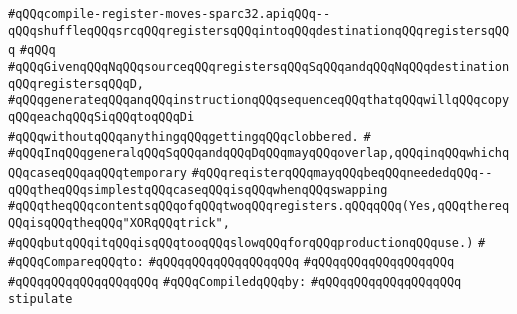 \label{src/lib/compiler/back/low/sparc32/code/compile-register-moves-sparc32.api}
\verb|#qQQqcompile-register-moves-sparc32.apiqQQq--qQQqshuffleqQQqsrcqQQqregistersqQQqintoqQQqdestinationqQQqregistersqQQq|\newline
\verb|#qQQq|\newline
\verb|#qQQqGivenqQQqNqQQqsourceqQQqregistersqQQqSqQQqandqQQqNqQQqdestinationqQQqregistersqQQqD,|\newline
\verb|#qQQqgenerateqQQqanqQQqinstructionqQQqsequenceqQQqthatqQQqwillqQQqcopyqQQqeachqQQqSiqQQqtoqQQqDi|\newline
\verb|#qQQqwithoutqQQqanythingqQQqgettingqQQqclobbered.|\newline
\verb|#|\newline
\verb|#qQQqInqQQqgeneralqQQqSqQQqandqQQqDqQQqmayqQQqoverlap,qQQqinqQQqwhichqQQqcaseqQQqaqQQqtemporary|\newline
\verb|#qQQqreqisterqQQqmayqQQqbeqQQqneededqQQq--qQQqtheqQQqsimplestqQQqcaseqQQqisqQQqwhenqQQqswapping|\newline
\verb|#qQQqtheqQQqcontentsqQQqofqQQqtwoqQQqregisters.qQQqqQQq(Yes,qQQqthereqQQqisqQQqtheqQQq"XORqQQqtrick",|\newline
\verb|#qQQqbutqQQqitqQQqisqQQqtooqQQqslowqQQqforqQQqproductionqQQquse.)|\newline
\verb|#|\newline
\verb|#qQQqCompareqQQqto:|\newline
\verb|#qQQqqQQqqQQqqQQqqQQq|\newline
\verb|#qQQqqQQqqQQqqQQqqQQq|\newline
\verb|#qQQqqQQqqQQqqQQqqQQq|\newline
\newline
\verb|#qQQqCompiledqQQqby:|\newline
\verb|#qQQqqQQqqQQqqQQqqQQq|\newline
\newline
\verb|stipulate|\newline
